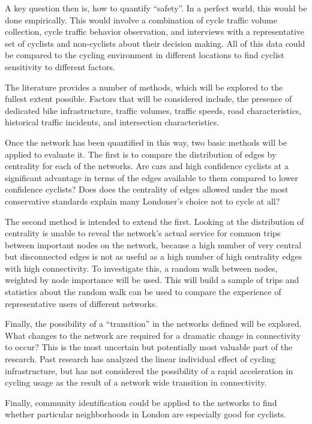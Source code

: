 \documentclass[11pt]{article} %
\begin{document}
A key question then is, how to quantify ``safety''. In a perfect world, this would be done empirically. This would involve a combination of cycle traffic volume collection, cycle traffic behavior observation, and interviews with a representative set of cyclists and non-cyclists about their decision making. All of this data could be compared to the cycling environment in different locations to find cyclist sensitivity to different factors.  

The literature provides a number of methods, which will be explored to the fullest extent possible. Factors that will be considered include, the presence of dedicated bike infrastructure, traffic volumes, traffic speeds, road characteristics, historical traffic incidents, and intersection characteristics. 

Once the network has been quantified in this way, two basic methods will be applied to evaluate it. The first is to compare the distribution of edges by centrality for each of the networks. Are cars and high confidence cyclists at a significant advantage in terms of the edges available to them compared to lower confidence cyclists? Does does the centrality of edges allowed under the most conservative standards explain many Londoner's choice not to cycle at all? 

The second method is intended to extend the first. Looking at the distribution of centrality is unable to reveal the network's actual service for common trips between important nodes on the network, because a high number of very central but disconnected edges is not as useful as a high number of high centrality edges with high connectivity. To investigate this, a random walk between nodes, weighted by node importance will be used. This will build a sample of trips and statistics about the random walk can be used to compare the experience of representative users of different networks. 

Finally, the possibility of a ``transition'' in the networks defined will be explored. What changes to the network are required for a dramatic change in connectivity to occur? This is the most uncertain but potentially most valuable part of the research. Past research has analyzed the linear individual effect of cycling infrastructure, but has not considered the possibility of a rapid acceleration in cycling usage as the result of a network wide transition in connectivity. 

Finally, community identification could be applied to the networks to find whether particular neighborhoods in London are especially good for cyclists. 
\end{document}
